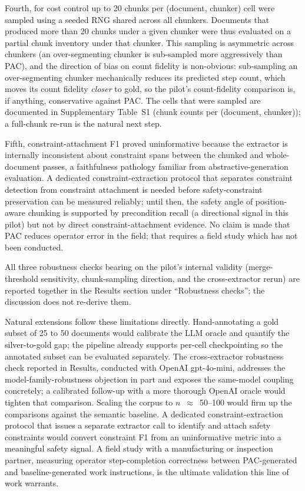 \documentclass[fleqn,10pt]{wlscirep}
\begin{document}
Fourth, for cost control up to 20 chunks per (document, chunker) cell
were sampled using a seeded RNG shared across all chunkers. Documents
that produced more than 20 chunks under a given chunker were thus
evaluated on a partial chunk inventory under that chunker. This
sampling is asymmetric across chunkers (an over-segmenting chunker is
sub-sampled more aggressively than PAC), and the direction of bias on
count fidelity is non-obvious: sub-sampling an over-segmenting chunker
mechanically reduces its predicted step count, which moves its count
fidelity \emph{closer} to gold, so the pilot's count-fidelity
comparison is, if anything, conservative against PAC. The cells that
were sampled are documented in Supplementary Table~S1 (chunk counts
per (document, chunker)); a full-chunk re-run is the natural next
step.

Fifth, constraint-attachment F1 proved uninformative because the
extractor is internally inconsistent about constraint spans between the
chunked and whole-document passes, a faithfulness pathology familiar
from abstractive-generation evaluation\cite{maynez2020faithfulness}. A
dedicated constraint-extraction protocol that separates constraint
detection from constraint attachment is needed before safety-constraint
preservation can be measured reliably; until then, the safety angle of
position-aware chunking is supported by precondition recall (a
directional signal in this pilot) but not by direct
constraint-attachment evidence. No claim is made that PAC reduces
operator error in the field; that requires a field study which has
not been conducted.

All three robustness checks bearing on the pilot's internal validity
(merge-threshold sensitivity, chunk-sampling direction, and the
cross-extractor rerun) are reported together in the Results section
under ``Robustness checks''; the discussion does not re-derive them.

Natural extensions follow these limitations directly. Hand-annotating
a gold subset of 25 to 50 documents would calibrate the LLM oracle and
quantify the silver-to-gold gap; the pipeline already supports per-cell
checkpointing so the annotated subset can be evaluated separately. The
cross-extractor robustness check reported in Results, conducted with
OpenAI gpt-4o-mini, addresses the model-family-robustness objection in
part and exposes the same-model coupling concretely; a calibrated
follow-up with a more thorough OpenAI oracle would tighten that
comparison. Scaling the corpus to $n$~$\approx$~50--100 would firm up
the comparisons against the semantic baseline. A dedicated
constraint-extraction protocol that issues a separate extractor call
to identify and attach safety constraints would convert constraint F1
from an uninformative metric into a meaningful safety signal. A field
study with a manufacturing or inspection partner, measuring operator
step-completion correctness between PAC-generated and baseline-generated
work instructions, is the ultimate validation this line of work
warrants.
\end{document}

